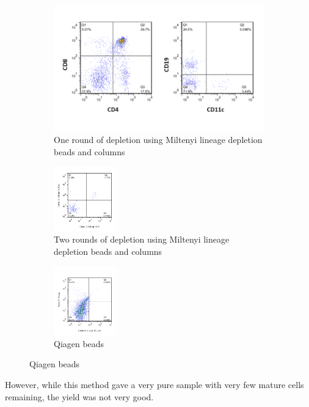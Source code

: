 \begin{figure}
	\begin{subfigure}{\textwidth}
	\includegraphics[width=\textwidth]{Figures/1rounddepletion.png}
	\caption{One round of depletion using Miltenyi lineage depletion beads and columns}
	\end{subfigure}
	\hfill
	\begin{subfigure}{\textwidth}
	\includegraphics[width=0.3\textwidth]{Figures/2rounddepletion.png}
	\caption{Two rounds of depletion using Miltenyi lineage depletion beads and columns}
	\end{subfigure}
	\hfill
	\begin{subfigure}{\textwidth}
	\includegraphics[width=0.3\textwidth] {Figures/Qiagenbeads.png}
	\caption{Qiagen beads}
	\end{subfigure}
\end{figure}
However, while this method gave a very pure sample with very few mature cells remaining, the yield was not very good.

